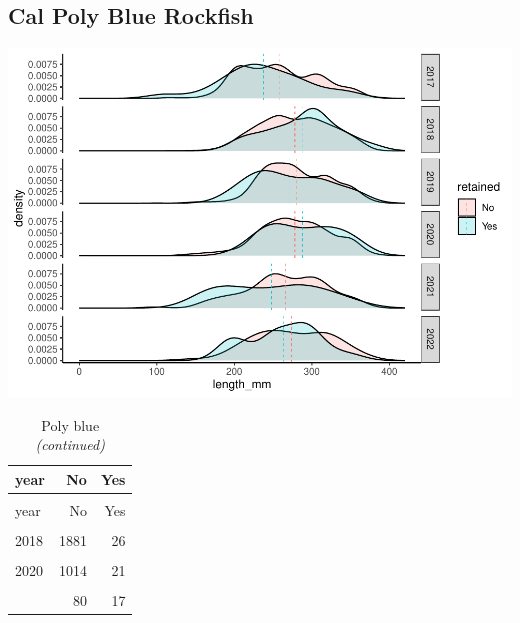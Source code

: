 \documentclass[
]{article}
\begin{document}
\hypertarget{cal-poly-blue-rockfish}{%
\subsection{Cal Poly Blue Rockfish}\label{cal-poly-blue-rockfish}}

\includegraphics{CCRFP_species_otolith_summary_2023_files/figure-latex/unnamed-chunk-3-1.pdf}

\begin{longtable}[t]{lrr}
\caption{\label{tab:unnamed-chunk-4}Poly blue}\\
\toprule
year & No & Yes\\
\midrule
\endfirsthead
\caption[]{\label{tab:unnamed-chunk-4}Poly blue \textit{(continued)}}\\
\toprule
year & No & Yes\\
\midrule
\endhead

\endfoot
\bottomrule
\endlastfoot
\cellcolor{gray!6}{2017} & \cellcolor{gray!6}{2470} & \cellcolor{gray!6}{21}\\
2018 & 1881 & 26\\
\cellcolor{gray!6}{2019} & \cellcolor{gray!6}{934} & \cellcolor{gray!6}{43}\\
2020 & 1014 & 21\\
\cellcolor{gray!6}{2021} & \cellcolor{gray!6}{342} & \cellcolor{gray!6}{54}\\
\addlinespace
2022 & 80 & 17\\*
\end{longtable}
\end{document}
